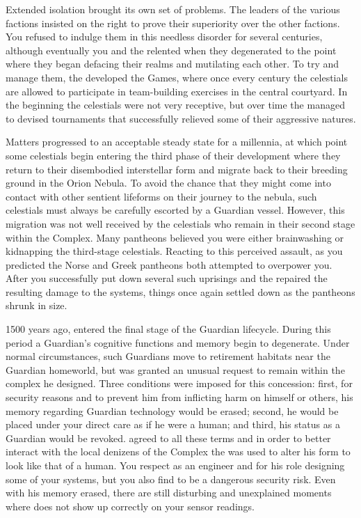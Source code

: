 \documentclass[char]{guardians}
\begin{document}
Extended isolation brought its own set of problems. The leaders of the various factions insisted on the right to prove their superiority over the other factions. You refused to indulge them in this needless disorder for several centuries, although eventually you and the \cCaretaker{} relented when they degenerated to the point where they began defacing their realms and mutilating each other. To try and manage them, the \cCaretaker{} developed the Games, where once every century the celestials are allowed to participate in team-building exercises in the central courtyard. In the beginning the celestials were not very receptive, but over time the \cCaretaker{} managed to devised tournaments that successfully relieved some of their aggressive natures.

Matters progressed to an acceptable steady state for a millennia, at which point some celestials begin entering the third phase of their development where they return to their disembodied interstellar form and migrate back to their breeding ground in the Orion Nebula. To avoid the chance that they might come into contact with other sentient lifeforms on their journey to the nebula, such celestials must always be carefully escorted by a Guardian vessel. However, this migration was not well received by the celestials who remain in their second stage within the Complex. Many pantheons believed you were either brainwashing or kidnapping the third-stage celestials. Reacting to this perceived assault, as you predicted the Norse and Greek pantheons both attempted to overpower you. After you successfully put down several such uprisings and the \cCaretaker{} repaired the resulting damage to the systems, things once again settled down as the pantheons shrunk in size.

1500 years ago, \cJascha{} entered the final stage of the Guardian lifecycle. During this period a Guardian's cognitive functions and memory begin to degenerate. Under normal circumstances, such Guardians move to retirement habitats near the Guardian homeworld, but \cJascha{} was granted an unusual request to remain within the complex he designed. Three conditions were imposed for this concession: first, for security reasons and to prevent him from inflicting harm on himself or others, his memory regarding Guardian technology would be erased; second, he would be placed under your direct care as if he were a human; and third, his status as a Guardian would be revoked. \cJascha{} agreed to all these terms and in order to better interact with the local denizens of the Complex the \assembler{} was used to alter his form to look like that of a human. You respect \cJascha{} as an engineer and for his role designing some of your systems, but you also find \cJascha{\them} to be a dangerous security risk. Even with his memory erased, there are still disturbing and unexplained moments where \cJascha{\they} does not show up correctly on your sensor readings.
\end{document}
